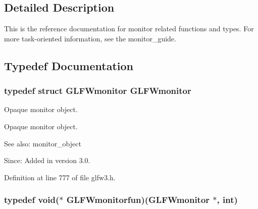 

\subsection{Detailed Description}
This is the reference documentation for monitor related functions and types. For more task-oriented information, see the monitor\_\-guide. 

\subsection{Typedef Documentation}
\hypertarget{group__monitor_g8d9efd1cde9426692c73fe40437d0ae3}{
\subsubsection[GLFWmonitor]{\setlength{\rightskip}{0pt plus 5cm}typedef struct {\bf GLFWmonitor} {\bf GLFWmonitor}}}
\label{group__monitor_g8d9efd1cde9426692c73fe40437d0ae3}


Opaque monitor object. 

Opaque monitor object.

\begin{Desc}
\item[See also:]monitor\_\-object\end{Desc}
\begin{Desc}
\item[Since:]Added in version 3.0. \end{Desc}


Definition at line 777 of file glfw3.h.\hypertarget{group__monitor_g67b74af6cecfdbccc7e57a6319a57210}{
\subsubsection[GLFWmonitorfun]{\setlength{\rightskip}{0pt plus 5cm}typedef void($\ast$  {\bf GLFWmonitorfun})({\bf GLFWmonitor} $\ast$, int)}}
\label{group__monitor_g67b74af6cecfdbccc7e57a6319a57210}


